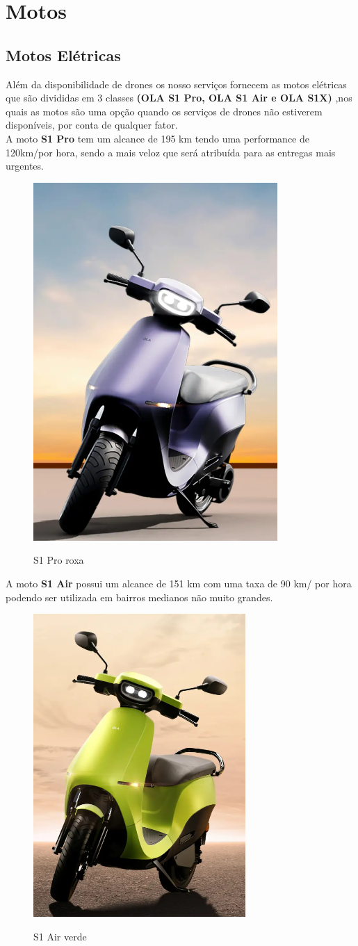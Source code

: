 \chapter{Motos}
\label{ch:identificador}
	\section{Motos Elétricas}
 
 Além da disponibilidade de drones os nosso serviços fornecem as motos elétricas que são divididas em 3 classes \textbf{(OLA S1 Pro, OLA S1 Air e OLA S1X)} ,nos quais as motos são uma opção quando os serviços de drones não estiverem disponíveis, por conta de qualquer fator.\\
 
A moto \textbf{S1 Pro} tem um alcance de 195 km tendo uma performance de 120km/por hora, sendo a mais veloz que será atribuída para as entregas mais urgentes.\\

\begin{figure} [!ht]
    {\centering
    \caption{S1 Pro roxa}
    \includegraphics[height=0.3\linewidth]{figuras/S1 Pro.png}
    \label{fig:enter-label}
    }
\end{figure}

A moto \textbf{S1 Air} possui um alcance de 151 km com uma taxa de 90 km/ por hora podendo ser utilizada em bairros medianos não muito grandes.\\

\begin{figure} [!ht]
   { \centering
    \caption{S1 Air verde}
    \includegraphics[height=0.3\linewidth]{figuras/S1 AIR.png}
    \label{fig:enter-label}
    }
\end{figure}

